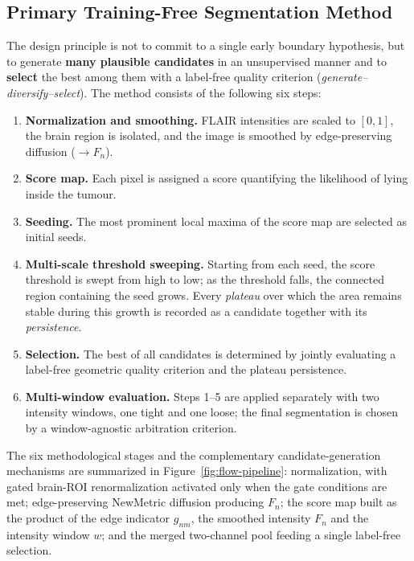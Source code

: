 \documentclass[11pt,a4paper]{article}
\begin{document}
\subsection{Primary Training-Free Segmentation Method}\label{sec:overview-legacy}

The design principle is not to commit to a single early boundary hypothesis,
but to generate \textbf{many plausible candidates} in an unsupervised manner and
to \textbf{select} the best among them with a label-free quality criterion
(\emph{generate--diversify--select}). The method consists of the following six
steps:

\begin{enumerate}\itemsep1pt
\item \textbf{Normalization and smoothing.} FLAIR intensities are scaled to
$[0,1]$, the brain region is isolated, and the image is smoothed by
edge-preserving diffusion ($\to F_n$).
\item \textbf{Score map.} Each pixel is assigned a score quantifying the
likelihood of lying inside the tumour.
\item \textbf{Seeding.} The most prominent local maxima of the score map are
selected as initial seeds.
\item \textbf{Multi-scale threshold sweeping.} Starting from each seed, the score
threshold is swept from high to low; as the threshold falls, the connected region
containing the seed grows. Every \emph{plateau} over which the area remains stable
during this growth is recorded as a candidate together with its
\emph{persistence}.
\item \textbf{Selection.} The best of all candidates is determined by jointly
evaluating a label-free geometric quality criterion and the plateau persistence.
\item \textbf{Multi-window evaluation.} Steps 1--5 are applied separately with
two intensity windows, one tight and one loose; the final segmentation is chosen
by a window-agnostic arbitration criterion.
\end{enumerate}

The six methodological stages and the complementary candidate-generation
mechanisms are summarized in Figure~\ref{fig:flow-pipeline}:
normalization, with gated brain-ROI renormalization activated only when the gate
conditions are met; edge-preserving NewMetric diffusion producing $F_n$; the score
map built as the product of the edge indicator $g_{nm}$, the smoothed intensity
$F_n$ and the intensity window $w$; and the merged two-channel pool feeding a
single label-free selection.
\end{document}
